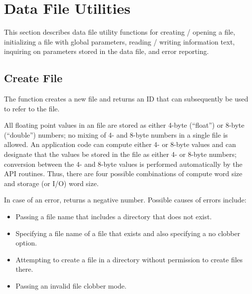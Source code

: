 \section{Data File Utilities}\label{sec:utilities}

This section describes data file utility functions for creating /
opening a file, initializing a file with global parameters, reading /
writing information text, inquiring on parameters stored in the data
file, and error reporting.

\subsection{Create \exo{} File}

The function  creates a new
\exo{} file and returns an ID that can subsequently be used to
refer to the file.

All floating point values in an \exo{} file are stored as either
4-byte (``float'') or 8-byte (``double'') numbers; no mixing
of 4- and 8-byte numbers in a single file is allowed. An application
code can compute either 4- or 8-byte values and can designate that the
values be stored in the \exo{} file as either 4- or 8-byte numbers;
conversion between the 4- and 8-byte values is performed automatically
by the API routines. Thus, there are four possible combinations of
compute word size and storage (or I/O) word size.

In case of an error,  returns a negative
number. Possible causes of errors include:

\begin{itemize}

 \item Passing a file name that includes a directory that does not
 exist.

 \item Specifying a file name of a file that exists and also
 specifying a no clobber option.

 \item Attempting to create a file in a directory without permission
 to create files there.

 \item Passing an invalid file clobber mode.
\end{itemize}



